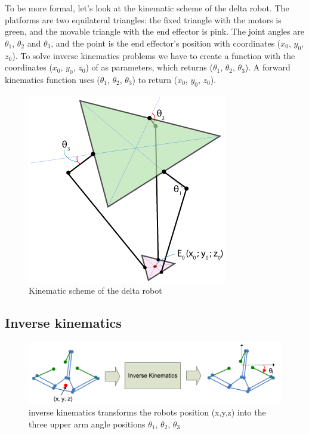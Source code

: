 To be more formal, let's look at the kinematic scheme of the delta robot. The platforms are two equilateral triangles: the fixed triangle with the motors is green, and the movable triangle with the end effector is pink. The joint angles are $\theta_{1}$, $\theta_{2}$ and $\theta_{3}$, and the point is the end effector’s position with coordinates ($x_{0}$, $y_{0}$, $z_{0}$).
To solve inverse kinematics problems we have to create a function with the coordinates ($x_{0}$, $y_{0}$, $z_{0}$) of as parameters, which returns ($\theta_{1}$, $\theta_{2}$, $\theta_{3}$). A forward kinematics function uses ($\theta_{1}$, $\theta_{2}$, $\theta_{3}$) to return ($x_{0}$, $y_{0}$, $z_{0}$).
\begin{figure}[H]
	\centering
	\includegraphics[width=\maxwidth{11cm}, keepaspectratio]{Chapters/Fig/kinematic_scheme.png}
	\caption{Kinematic scheme of the delta robot}
	\label{fig:kinematic_scheme}
\end{figure}
\subsection{Inverse kinematics}
\begin{figure}[H]
	\centering
	\includegraphics[width=\maxwidth{15cm}, keepaspectratio]{Chapters/Fig/inverse_kinematics.png}
	\caption{inverse kinematics transforms the robots position (x,y,z) into the three upper arm angle positions $\theta_{1}$, $\theta_{2}$, $\theta_{3}$}
	\label{fig:inverse_kinematics}
\end{figure}
